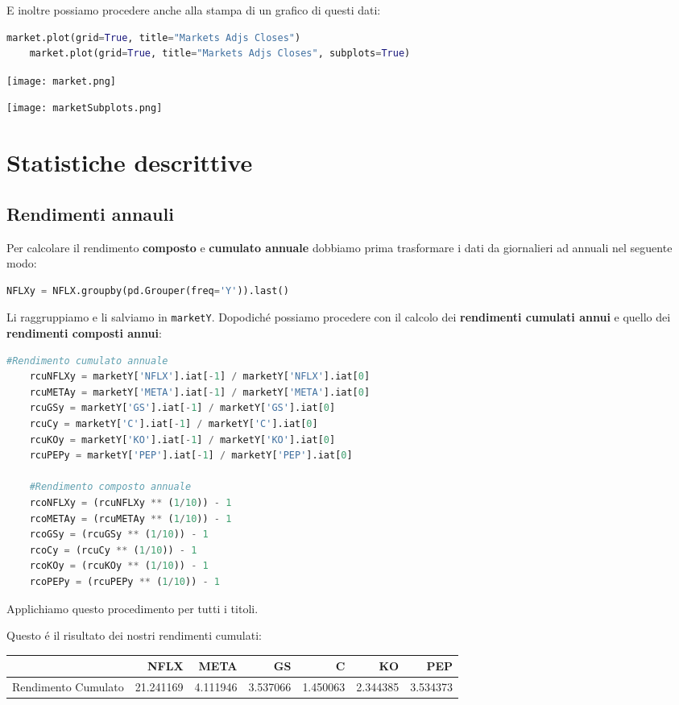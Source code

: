 \documentclass{report}
\begin{document}
E inoltre possiamo procedere anche alla stampa di un grafico di questi dati:
\begin{lstlisting}[language=python]
    market.plot(grid=True, title="Markets Adjs Closes")
    market.plot(grid=True, title="Markets Adjs Closes", subplots=True)
\end{lstlisting}

\texttt{[image: market.png]}

\texttt{[image: marketSubplots.png]}

\chapter{Statistiche descrittive}
\section{Rendimenti annauli}
Per calcolare il rendimento \textbf{composto} e \textbf{cumulato annuale} dobbiamo prima trasformare i dati da giornalieri ad annuali nel seguente modo:
\begin{lstlisting}[language=python]
    NFLXy = NFLX.groupby(pd.Grouper(freq='Y')).last()
\end{lstlisting}
Li raggruppiamo e li salviamo in \lstinline{marketY}.
Dopodiché possiamo procedere con il calcolo dei \textbf{rendimenti cumulati annui} e quello dei \textbf{rendimenti composti annui}:
\begin{lstlisting}[language=python]
    #Rendimento cumulato annuale
    rcuNFLXy = marketY['NFLX'].iat[-1] / marketY['NFLX'].iat[0]
    rcuMETAy = marketY['META'].iat[-1] / marketY['META'].iat[0]
    rcuGSy = marketY['GS'].iat[-1] / marketY['GS'].iat[0]
    rcuCy = marketY['C'].iat[-1] / marketY['C'].iat[0]
    rcuKOy = marketY['KO'].iat[-1] / marketY['KO'].iat[0]
    rcuPEPy = marketY['PEP'].iat[-1] / marketY['PEP'].iat[0]
    
    #Rendimento composto annuale
    rcoNFLXy = (rcuNFLXy ** (1/10)) - 1
    rcoMETAy = (rcuMETAy ** (1/10)) - 1
    rcoGSy = (rcuGSy ** (1/10)) - 1
    rcoCy = (rcuCy ** (1/10)) - 1
    rcoKOy = (rcuKOy ** (1/10)) - 1
    rcoPEPy = (rcuPEPy ** (1/10)) - 1
\end{lstlisting}
Applichiamo questo procedimento per tutti i titoli.

\noindent Questo é il risultato dei nostri rendimenti cumulati:

\begin{tabular}{lrrrrrr}
\toprule
{} &       NFLX &      META &        GS &         C &        KO &       PEP \\
\midrule
Rendimento Cumulato &  21.241169 &  4.111946 &  3.537066 &  1.450063 &  2.344385 &  3.534373 \\
\bottomrule
\end{tabular}
\end{document}
